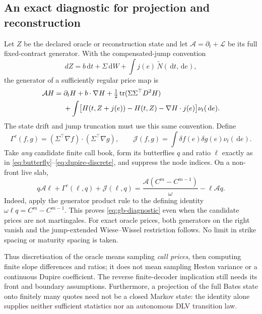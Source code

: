 \documentclass[11pt,a4paper]{article}
\numberwithin{equation}{section}
\theoremstyle{definition}\newtheorem{definition}[theorem]{Definition}
\theoremstyle{remark}\newtheorem{remark}[theorem]{Remark}
\newcommand{\dd}{\,\mathrm d}\newcommand{\dt}{\,\mathrm dt}
\begin{document}
\subsection{An exact diagnostic for projection and reconstruction}
Let $Z$ be the declared oracle or reconstruction state and let $\mathcal A=\partial_t+\mathcal L$ be its full fixed-contract generator. With the compensated-jump convention
\[
 dZ=b\dt+\Sigma\dd W+\int j(e)\,\widetilde N(\dd t,\dd e),
\]
the generator of a sufficiently regular price map is
\begin{align}
 \mathcal A H={}&\partial_tH+b\cdot\nabla H
 +\tfrac12\operatorname{tr}(\Sigma\Sigma^\top D^2H)\notag\\
 &+\int\bigl[H(t,Z+j(e))-H(t,Z)-\nabla H\cdot j(e)\bigr]
             \nu_t(\dd e).
 \label{eq:gb-generator}
\end{align}
The state drift and jump truncation must use this same convention. Define
\[
 \Gamma^c(f,g)=(\Sigma^\top\nabla f)\cdot(\Sigma^\top\nabla g),
 \qquad \mathcal J(f,g)=\int\delta f(e)\delta g(e)\nu_t(\dd e).
\]
Take \emph{any} candidate finite call book, form its butterflies $q$ and ratio $\ell$ exactly as in \eqref{eq:butterfly}--\eqref{eq:dupire-discrete}, and suppress the node indices. On a non-front live slab,
\begin{equation}
 \boxed{\quad
 q\mathcal A\ell+\Gamma^c(\ell,q)+\mathcal J(\ell,q)
 =\frac{\mathcal A(C^m-C^{m-1})}{\omega}-\ell\mathcal A q.
 \quad}
 \label{eq:gb-diagnostic}
\end{equation}
Indeed, apply the generator product rule to the defining identity $\omega\ell q=C^m-C^{m-1}$. This proves \eqref{eq:gb-diagnostic} even when the candidate prices are not martingales. For exact oracle prices, both generators on the right vanish and the jump-extended Wiese--Wissel restriction follows. No limit in strike spacing or maturity spacing is taken.

Thus discretisation of the oracle means sampling \emph{call prices}, then computing finite slope differences and ratios; it does not mean sampling Heston variance or a continuous Dupire coefficient. The reverse finite-decoder implication still needs its front and boundary assumptions. Furthermore, a projection of the full Bates state onto finitely many quotes need not be a closed Markov state: the identity alone supplies neither sufficient statistics nor an autonomous DLV transition law.
\end{document}
